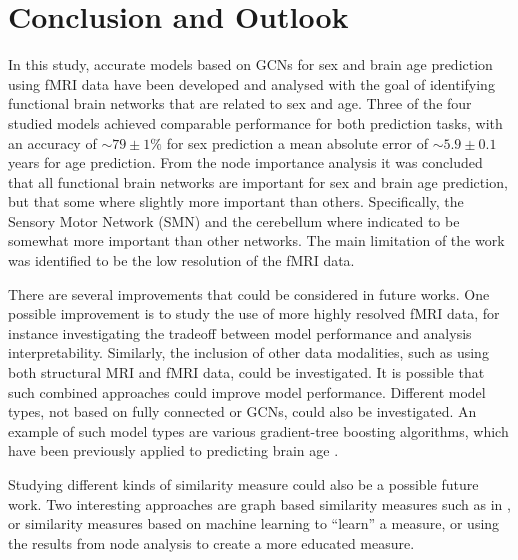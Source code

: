 

\chapter{Conclusion and Outlook}

In this study, accurate models based on GCNs for sex and brain age prediction using fMRI data have been developed and analysed with the goal of identifying functional brain networks that are related to sex and age. Three of the four studied models achieved comparable performance for both prediction tasks, with an accuracy of $\sim79\pm1\%$ for sex prediction a mean absolute error of $\sim5.9\pm0.1$ years for age prediction. From the node importance analysis it was concluded that all functional brain networks are important for sex and brain age prediction, but that some where slightly more important than others. Specifically, the Sensory Motor Network (SMN) and the cerebellum where indicated to be somewhat more important than other networks. The main limitation of the work was identified to be the low resolution of the fMRI data.

There are several improvements that could be considered in future works. One possible improvement is to study the use of more highly resolved fMRI data, for instance investigating the tradeoff between model performance and analysis interpretability. Similarly, the inclusion of other data modalities, such as using both structural MRI and fMRI data, could be investigated. It is possible that such combined approaches could improve model performance. Different model types, not based on fully connected or GCNs, could also be investigated. An example of such model types are various gradient-tree boosting algorithms, which have been previously applied to predicting brain age \cite{kaufmann}.

Studying different kinds of similarity measure could also be a possible future work. Two interesting approaches are graph based similarity measures such as in \cite{higcn}, or similarity measures based on machine learning to ``learn'' a measure, or using the results from node analysis to create a more educated measure.

